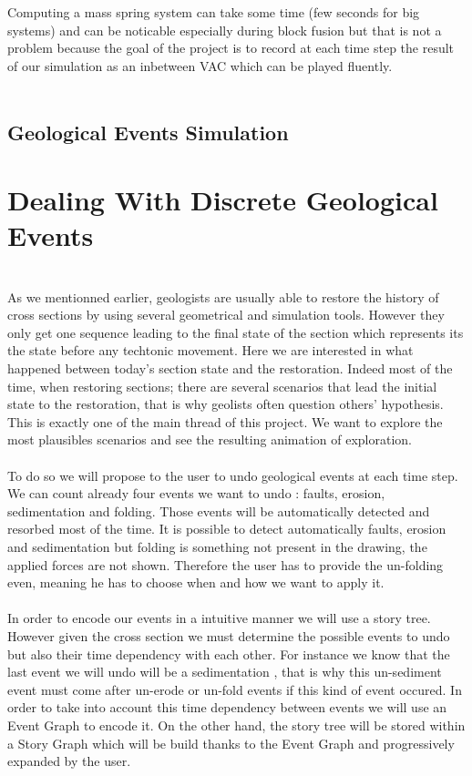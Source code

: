 \documentclass[12pt, a4paper]{report} %
\begin{document}
Computing a mass spring system can take some time (few seconds for big systems) and can be noticable especially during block fusion but that is not a problem because the goal of the project is to record at each time step the result of our simulation as an inbetween VAC which can be played fluently.\\\\

\section{Geological Events Simulation}

\chapter{Dealing With Discrete Geological Events}\\

As we mentionned earlier, geologists are usually able to restore the history of cross sections by using several geometrical and simulation tools. However they only get one sequence leading to the final state of the section which represents its the state before any techtonic movement. Here we are interested in what happened between today's section state and the restoration. Indeed most of the time, when restoring sections; there are several scenarios that lead the initial state to the restoration, that is why geolists often question others' hypothesis. This is exactly one of the main thread of this project. We want to explore the most plausibles scenarios and see the resulting animation of exploration.\\\\
To do so we will propose to the user to undo geological events at each time step. We can count already four events we want to undo : faults, erosion, sedimentation and  folding. Those events will be automatically detected and resorbed most of the time. It is possible to detect automatically faults, erosion and sedimentation but folding is something not present in the drawing, the applied forces are not shown. Therefore the user has to provide the un-folding even, meaning he has to choose when and how we want to apply it.\\\\ 

In order to encode our events in a intuitive manner we will use a story tree. However given the cross section we must determine the possible events to undo but also their time dependency with each other. For instance we know that the last event we will undo will be a sedimentation , that is why this un-sediment event must come after un-erode or un-fold events if this kind of event occured. In order to take into account this time dependency between events we will use an Event Graph to encode it. On the other hand, the story tree will be stored within a Story Graph which will be build thanks to the Event Graph and progressively expanded by the user.\\\\
\end{document}
